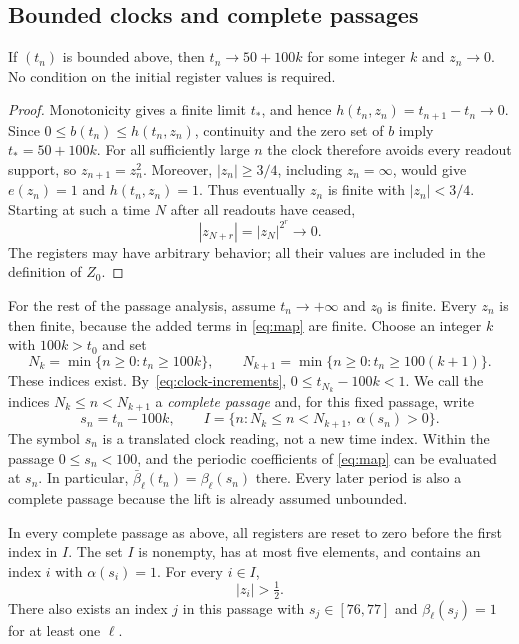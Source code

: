 \subsection{Bounded clocks and complete passages}

\begin{lemma}\label{lem:bounded-clock}
If $(t_n)$ is bounded above, then $t_n\to50+100k$ for some integer $k$ and
$z_n\to0$.  No condition on the initial register values is required.
\end{lemma}

\begin{proof}
Monotonicity gives a finite limit $t_*$, and hence
$h(t_n,z_n)=t_{n+1}-t_n\to0$.  Since $0\le b(t_n)\le h(t_n,z_n)$,
continuity and the zero set of $b$ imply $t_*=50+100k$.
For all sufficiently large $n$ the clock therefore avoids every readout
support, so $z_{n+1}=z_n^2$.  Moreover, $|z_n|\ge3/4$, including $z_n=\infty$,
would give $e(z_n)=1$ and $h(t_n,z_n)=1$.  Thus eventually $z_n$ is finite
with $|z_n|<3/4$.  Starting at such a time $N$ after all readouts have ceased,
\[
 |z_{N+r}|=|z_N|^{2^r}\longrightarrow0.
\]
The registers may have arbitrary behavior; all their values are included
in the definition of $Z_0$.
\end{proof}

For the rest of the passage analysis, assume $t_n\to+\infty$ and $z_0$ is
finite.  Every $z_n$ is then finite, because the added terms in
\eqref{eq:map} are finite.  Choose an integer $k$ with $100k>t_0$ and set
\[
 N_k=\min\{n\ge0:t_n\ge100k\},\qquad
 N_{k+1}=\min\{n\ge0:t_n\ge100(k+1)\}.
\]
These indices exist.  By~\eqref{eq:clock-increments},
$0\le t_{N_k}-100k<1$.  We call the indices
$N_k\le n<N_{k+1}$ a \emph{complete passage} and, for this fixed passage,
write
\[
 s_n=t_n-100k,\qquad
 I=\{n:N_k\le n<N_{k+1},\ \alpha(s_n)>0\}.
\]
The symbol $s_n$ is a translated clock reading, not a new time index.
Within the passage $0\le s_n<100$, and the periodic coefficients of
\eqref{eq:map} can be evaluated at $s_n$.  In particular,
$\bar\beta_\ell(t_n)=\beta_\ell(s_n)$ there.  Every later period is also a complete
passage because the lift is already assumed unbounded.

\begin{lemma}\label{lem:passage-preparation}
In every complete passage as above, all registers are reset to zero before
the first index in $I$.  The set $I$ is nonempty, has at most five elements,
and contains an index $i$ with $\alpha(s_i)=1$.  For every $i\in I$,
\begin{equation}\label{eq:preparation-radius}
 |z_i|>\tfrac12.
\end{equation}
There also exists an index $j$ in this passage with $s_j\in[76,77]$ and
$\beta_\ell(s_j)=1$ for at least one $\ell$.
\end{lemma}

